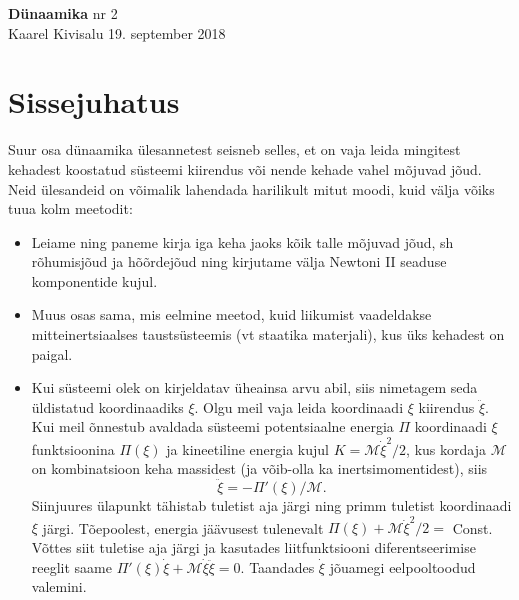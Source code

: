 \documentclass[a4paper,11pt,twocolumn]{article}
\begin{document}
{\huge \textbf{Dünaamika} \hfill \normalsize {nr 2}} \\
{Kaarel Kivisalu \hfill 19. september 2018}\\

\section*{Sissejuhatus}
Suur osa dünaamika ülesannetest seisneb selles, et on vaja leida mingitest kehadest koostatud süsteemi kiirendus või nende kehade vahel mõjuvad jõud. Neid ülesandeid on võimalik lahendada harilikult mitut moodi, kuid välja võiks tuua kolm meetodit:
\begin{itemize}
	\item Leiame ning paneme kirja iga keha jaoks kõik talle mõjuvad jõud, sh rõhumisjõud ja hõõrdejõud ning kirjutame välja Newtoni II seaduse komponentide kujul.
	\item Muus osas sama, mis eelmine meetod, kuid
	liikumist vaadeldakse mitteinertsiaalses taustsüsteemis
	(vt staatika materjali), kus üks kehadest on paigal.
	\item Kui süsteemi olek on kirjeldatav üheainsa arvu abil, siis nimetagem seda üldistatud koordinaadiks $ \xi $. Olgu meil vaja leida koordinaadi $ \xi $ kiirendus $ \ddot{\xi} $. Kui meil õnnestub avaldada süsteemi potentsiaalne energia $ \Pi $ koordinaadi $ \xi $ funktsioonina $ \Pi(\xi) $ ja kineetiline energia kujul $ K = \mathcal{M}\dot{\xi}^2/2 $, kus kordaja $ \mathcal{M} $ on kombinatsioon keha massidest (ja võib-olla ka inertsimomentidest), siis$$ \ddot{\xi}=−\Pi'(\xi)/\mathcal{M}.$$Siinjuures ülapunkt tähistab tuletist aja järgi ning primm tuletist koordinaadi $ \xi $ järgi. Tõepoolest, energia jäävusest tulenevalt $\Pi(\xi) + \mathcal{M}\dot{\xi}^2/2=$ Const. Võttes siit tuletise aja järgi 	ja kasutades liitfunktsiooni diferentseerimise reeglit saame $\Pi'(\xi)\dot{\xi} + \mathcal{M}\dot{\xi}\ddot{\xi}=0$. Taandades $ \dot{\xi} $ jõuamegi eelpooltoodud valemini.
\end{itemize}
\end{document}
